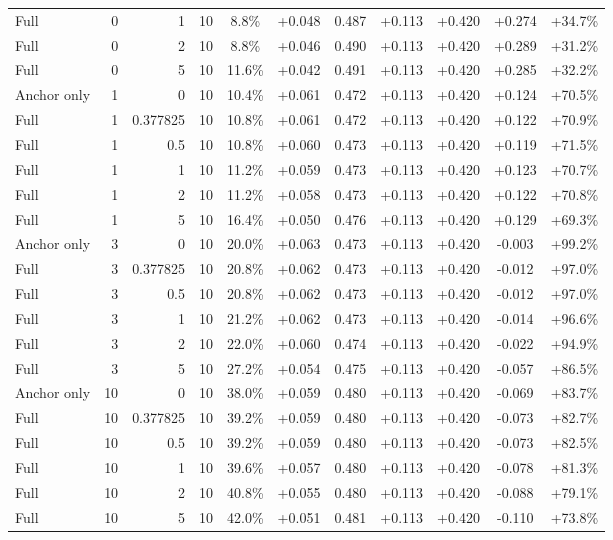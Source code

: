 \begin{table}[htbp]
\begin{tabular}{lrrrccccccc}
Full & 0 & 1 & 10 & 8.8\% & +0.048 & 0.487 & +0.113 & +0.420 & +0.274 & +34.7\% \\
Full & 0 & 2 & 10 & 8.8\% & +0.046 & 0.490 & +0.113 & +0.420 & +0.289 & +31.2\% \\
Full & 0 & 5 & 10 & 11.6\% & +0.042 & 0.491 & +0.113 & +0.420 & +0.285 & +32.2\% \\
Anchor only & 1 & 0 & 10 & 10.4\% & +0.061 & 0.472 & +0.113 & +0.420 & +0.124 & +70.5\% \\
Full & 1 & 0.377825 & 10 & 10.8\% & +0.061 & 0.472 & +0.113 & +0.420 & +0.122 & +70.9\% \\
Full & 1 & 0.5 & 10 & 10.8\% & +0.060 & 0.473 & +0.113 & +0.420 & +0.119 & +71.5\% \\
Full & 1 & 1 & 10 & 11.2\% & +0.059 & 0.473 & +0.113 & +0.420 & +0.123 & +70.7\% \\
Full & 1 & 2 & 10 & 11.2\% & +0.058 & 0.473 & +0.113 & +0.420 & +0.122 & +70.8\% \\
Full & 1 & 5 & 10 & 16.4\% & +0.050 & 0.476 & +0.113 & +0.420 & +0.129 & +69.3\% \\
Anchor only & 3 & 0 & 10 & 20.0\% & +0.063 & 0.473 & +0.113 & +0.420 & -0.003 & +99.2\% \\
Full & 3 & 0.377825 & 10 & 20.8\% & +0.062 & 0.473 & +0.113 & +0.420 & -0.012 & +97.0\% \\
Full & 3 & 0.5 & 10 & 20.8\% & +0.062 & 0.473 & +0.113 & +0.420 & -0.012 & +97.0\% \\
Full & 3 & 1 & 10 & 21.2\% & +0.062 & 0.473 & +0.113 & +0.420 & -0.014 & +96.6\% \\
Full & 3 & 2 & 10 & 22.0\% & +0.060 & 0.474 & +0.113 & +0.420 & -0.022 & +94.9\% \\
Full & 3 & 5 & 10 & 27.2\% & +0.054 & 0.475 & +0.113 & +0.420 & -0.057 & +86.5\% \\
Anchor only & 10 & 0 & 10 & 38.0\% & +0.059 & 0.480 & +0.113 & +0.420 & -0.069 & +83.7\% \\
Full & 10 & 0.377825 & 10 & 39.2\% & +0.059 & 0.480 & +0.113 & +0.420 & -0.073 & +82.7\% \\
Full & 10 & 0.5 & 10 & 39.2\% & +0.059 & 0.480 & +0.113 & +0.420 & -0.073 & +82.5\% \\
Full & 10 & 1 & 10 & 39.6\% & +0.057 & 0.480 & +0.113 & +0.420 & -0.078 & +81.3\% \\
Full & 10 & 2 & 10 & 40.8\% & +0.055 & 0.480 & +0.113 & +0.420 & -0.088 & +79.1\% \\
Full & 10 & 5 & 10 & 42.0\% & +0.051 & 0.481 & +0.113 & +0.420 & -0.110 & +73.8\% \\

\end{tabular}
\end{table}
